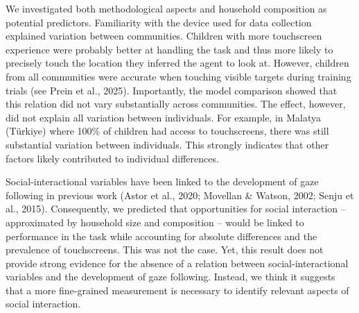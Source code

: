 \documentclass[
  man,floatsintext]{apa7}
\begin{document}
We investigated both methodological aspects and household composition as potential predictors. Familiarity with the device used for data collection explained variation between communities. Children with more touchscreen experience were probably better at handling the task and thus more likely to precisely touch the location they inferred the agent to look at. However, children from all communities were accurate when touching visible targets during training trials (see Prein et al., 2025). Importantly, the model comparison showed that this relation did not vary substantially across communities. The effect, however, did not explain all variation between individuals. For example, in Malatya (Türkiye) where 100\% of children had access to touchscreens, there was still substantial variation between individuals. This strongly indicates that other factors likely contributed to individual differences.

Social-interactional variables have been linked to the development of gaze following in previous work (Astor et al., 2020; Movellan \& Watson, 2002; Senju et al., 2015). Consequently, we predicted that opportunities for social interaction -- approximated by household size and composition -- would be linked to performance in the task while accounting for absolute differences and the prevalence of touchscreens. This was not the case. Yet, this result does not provide strong evidence for the absence of a relation between social-interactional variables and the development of gaze following. Instead, we think it suggests that a more fine-grained measurement is necessary to identify relevant aspects of social interaction.
\end{document}
